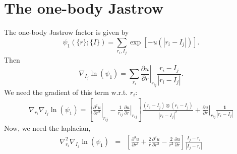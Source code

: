 \documentclass{article}
\begin{document}
\section{The one-body Jastrow}
The one-body Jastrow factor is given by
\begin{equation}
\psi_1(\{r\};\{I\}) = \sum_{r_i,I_j} \exp\left[-u(|r_i - I_j|)\right].
\end{equation}
Then
\begin{equation}
\nabla_{I_j} \ln(\psi_1) = \sum_{r_i} \left.\frac{\partial u}{\partial r}\right|_{r_{ij}} \frac{r_i - I_j}{|r_i-I_j|}.
\end{equation}
We need the gradient of this term w.r.t. $r_i$:
\begin{eqnarray}
\nabla_{r_i} \nabla_{I_j} \ln(\psi_1) = 
\left[\left.\frac{\partial^2 u}{\partial r^2} \right|_{r_{ij}} 
- \frac{1}{r_{ij}}\left.\frac{\partial u}{\partial r}\right|_{r_{ij}}
\right]\frac{(r_i - I_j)\otimes(r_i-I_j)}{|r_i-I_j|^2} + \left.\frac{\partial u}{\partial r}\right|_{r_{ij}} 
\frac{\mathbf{1}}{|r_i - I_j|}
\end{eqnarray}
Now, we need the laplacian,
\begin{eqnarray}
\nabla^2_{r_i} \nabla_{I_j} \ln(\psi_1) & = & \left[
\frac{\partial^3 u}{\partial r^3} + \frac{2}{r}\frac{\partial^2u}{\partial r^2} - \frac{2}{r^2}\frac{\partial u}{\partial r} \right] 
\frac{I_j - r_i}{|I_j - r_i|}
\end{eqnarray}
\end{document}
